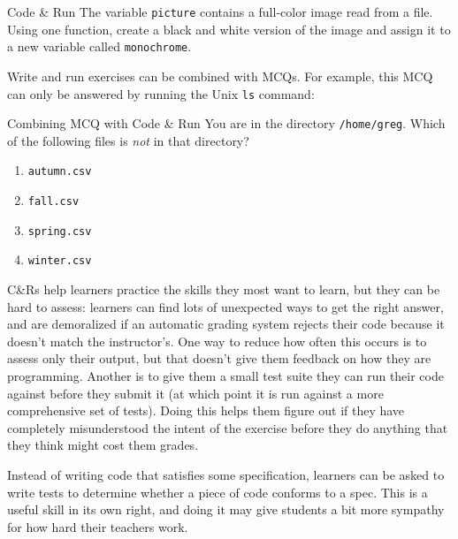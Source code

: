 \begin{aside}{Code \& Run}
  The variable \texttt{picture} contains a full-color image read from a file.
  Using one function, create a black and white version of the image and
  assign it to a new variable called \texttt{monochrome}.
\end{aside}

Write and run exercises can be combined with MCQs. For example, this MCQ
can only be answered by running the Unix \texttt{ls} command:

\begin{aside}{Combining MCQ with Code \& Run}
  You are in the directory \texttt{/home/greg}. Which of the following files is
  \emph{not} in that directory?

  \begin{enumerate}
  \item
    \texttt{autumn.csv}
  \item
    \texttt{fall.csv}
  \item
    \texttt{spring.csv}
  \item
    \texttt{winter.csv}
  \end{enumerate}
\end{aside}

C\&Rs help learners practice the skills they most want to learn, but
they can be hard to assess: learners can find lots of unexpected ways to
get the right answer, and are demoralized if an automatic grading system
rejects their code because it doesn't match the instructor's. One way to
reduce how often this occurs is to assess only their output, but that
doesn't give them feedback on how they are programming. Another is to
give them a small test suite they can run their code against before they
submit it (at which point it is run against a more comprehensive set of
tests). Doing this helps them figure out if they have completely
misunderstood the intent of the exercise before they do anything that
they think might cost them grades.

Instead of writing code that satisfies some specification, learners can
be asked to write tests to determine whether a piece of code conforms to
a spec. This is a useful skill in its own right, and doing it may give
students a bit more sympathy for how hard their teachers work.

